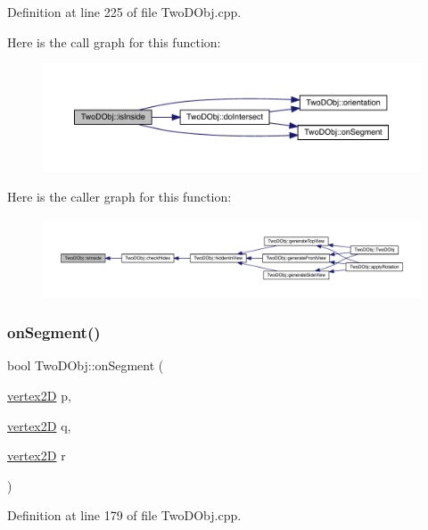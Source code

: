 Definition at line 225 of file Two\+D\+Obj.\+cpp.

Here is the call graph for this function\+:
\nopagebreak
\begin{figure}[H]
\begin{center}
\leavevmode
\includegraphics[width=350pt]{class_two_d_obj_a331a606153d723b8290bd885475bb1b5_cgraph}
\end{center}
\end{figure}
Here is the caller graph for this function\+:
\nopagebreak
\begin{figure}[H]
\begin{center}
\leavevmode
\includegraphics[width=350pt]{class_two_d_obj_a331a606153d723b8290bd885475bb1b5_icgraph}
\end{center}
\end{figure}
\mbox{\label{class_two_d_obj_a17f849373d477c1d46dfc917fe70c75b}} 
\subsubsection{\texorpdfstring{on\+Segment()}{onSegment()}}
{\footnotesize\ttfamily bool Two\+D\+Obj\+::on\+Segment (\begin{DoxyParamCaption}\item[{\mbox{\hyperlink{structvertex2_d}{vertex2D}}}]{p,  }\item[{\mbox{\hyperlink{structvertex2_d}{vertex2D}}}]{q,  }\item[{\mbox{\hyperlink{structvertex2_d}{vertex2D}}}]{r }\end{DoxyParamCaption})}



Definition at line 179 of file Two\+D\+Obj.\+cpp.

